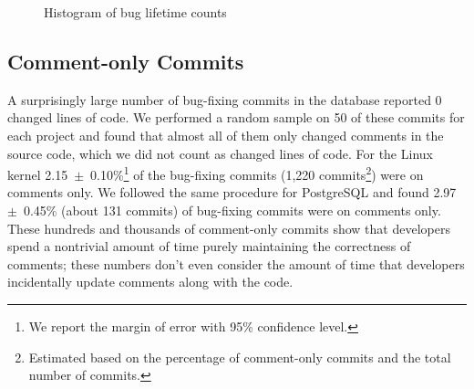 \begin{figure}[tbh]
\centering
{}
\caption{\label{fig-bug-lifetime}Histogram of bug lifetime counts}
\end{figure}

\subsection{Comment-only Commits}
\label{sec-comment-only}

A surprisingly large number of bug-fixing commits in the database reported 0
changed lines of code. We performed a random sample on 50 of these commits for
each project and found that almost all of them only changed comments in the
source code, which we did not count as changed lines of code. For the Linux
kernel 2.15~$\pm$~0.10\%\footnote{We report the margin of error with 95\%
  confidence level.}  of the bug-fixing commits (1,220
commits\footnote{Estimated based on the percentage of comment-only commits and
  the total number of commits.}) were on comments only. We followed the same
procedure for PostgreSQL and found 2.97~$\pm$~0.45\% (about 131 commits) of
bug-fixing commits were on comments only.  These hundreds and thousands of
comment-only commits show that developers spend a nontrivial amount of time
purely maintaining the correctness of comments; these numbers don't even
consider the amount of time that developers incidentally update comments along
with the code.

